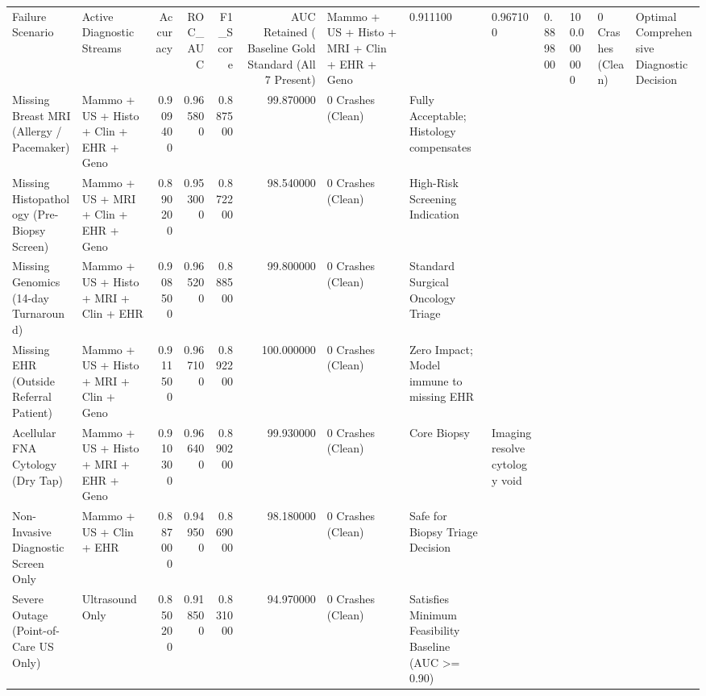 \begin{tabular}{llrrrrll}
\toprule
Failure Scenario & Active Diagnostic Streams & Accuracy & ROC_AUC & F1_Score & AUC Retained (%
\midrule
Baseline Gold Standard (All 7 Present) & Mammo + US + Histo + MRI + Clin + EHR + Geno & 0.911100 & 0.967100 & 0.889800 & 100.000000 & 0 Crashes (Clean) & Optimal Comprehensive Diagnostic Decision \\
Missing Breast MRI (Allergy / Pacemaker) & Mammo + US + Histo + Clin + EHR + Geno & 0.909400 & 0.965800 & 0.887500 & 99.870000 & 0 Crashes (Clean) & Fully Acceptable; Histology compensates \\
Missing Histopathology (Pre-Biopsy Screen) & Mammo + US + MRI + Clin + EHR + Geno & 0.890200 & 0.953000 & 0.872200 & 98.540000 & 0 Crashes (Clean) & High-Risk Screening Indication \\
Missing Genomics (14-day Turnaround) & Mammo + US + Histo + MRI + Clin + EHR & 0.908500 & 0.965200 & 0.888500 & 99.800000 & 0 Crashes (Clean) & Standard Surgical Oncology Triage \\
Missing EHR (Outside Referral Patient) & Mammo + US + Histo + MRI + Clin + Geno & 0.911500 & 0.967100 & 0.892200 & 100.000000 & 0 Crashes (Clean) & Zero Impact; Model immune to missing EHR \\
Acellular FNA Cytology (Dry Tap) & Mammo + US + Histo + MRI + EHR + Geno & 0.910300 & 0.966400 & 0.890200 & 99.930000 & 0 Crashes (Clean) & Core Biopsy & Imaging resolve cytology void \\
Non-Invasive Diagnostic Screen Only & Mammo + US + Clin + EHR & 0.887000 & 0.949500 & 0.869000 & 98.180000 & 0 Crashes (Clean) & Safe for Biopsy Triage Decision \\
Severe Outage (Point-of-Care US Only) & Ultrasound Only & 0.850200 & 0.918500 & 0.831000 & 94.970000 & 0 Crashes (Clean) & Satisfies Minimum Feasibility Baseline (AUC >= 0.90) \\
\bottomrule
\end{tabular}
